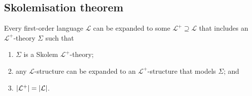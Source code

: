 \subsection{Skolemisation theorem}
\begin{theorem}
    Every first-order language \( \mathcal L \) can be expanded to some \( \mathcal L^+ \supseteq \mathcal L \) that includes an \( \mathcal L^+ \)-theory \( \Sigma \) such that
    \begin{enumerate}
        \item \( \Sigma \) is a Skolem \( \mathcal L^+ \)-theory;
        \item any \( \mathcal L \)-structure can be expanded to an \( \mathcal L^+ \)-structure that models \( \Sigma \); and
        \item \( \abs{\mathcal L^+} = \abs{\mathcal L} \).
    \end{enumerate}
\end{theorem}
